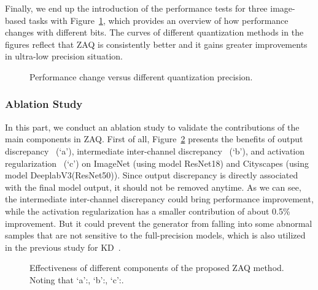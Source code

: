 \documentclass[final]{cvpr}
\begin{document}
Finally, we end up the introduction of the performance tests for three image-based tasks with Figure~\ref{fig:bit_Acc}, which provides an overview of how performance changes with different bits.
The curves of different quantization methods in the figures reflect that ZAQ is consistently better and it gains greater improvements in ultra-low precision situation. 

\begin{figure}[!h]
  \vspace{-2mm}
  \centering



  \caption{Performance change versus different quantization precision.}
  \label{fig:bit_Acc}
  \vspace{-2mm}
\end{figure}


\subsubsection{Ablation Study}

In this part, we conduct an ablation study to validate the contributions of the main components in ZAQ.
First of all, Figure~\ref{fig:ablation} presents the benefits of output discrepancy ~(`a'), intermediate inter-channel discrepancy ~(`b'), and activation regularization ~(`c') on ImageNet (using model ResNet18) and Cityscapes (using model DeeplabV3(ResNet50)).
Since output discrepancy  is directly associated with the final model output, it should not be removed anytime.
As we can see, the intermediate inter-channel discrepancy could bring  performance improvement, while the activation regularization has a smaller contribution of about 0.5\% improvement. 
But it could prevent the generator from falling into some abnormal samples that are not sensitive to the full-precision models, which is also utilized in the previous study for KD~\cite{chen2019data}.

\begin{figure}[!t]
  \centering
  \caption{Effectiveness of different components of the proposed ZAQ method. Noting that `a':, `b':, `c':.}
  \label{fig:ablation}
  \vspace{-2mm}
\end{figure}
\end{document}
